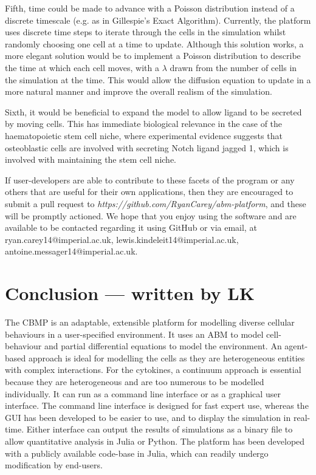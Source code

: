 \documentclass[12pt]{article}
\begin{document}
Fifth, time could be made to advance with a Poisson distribution instead 
of a discrete timescale (e.g. as in Gillespie's Exact Algorithm). 
Currently, the platform uses discrete time steps to iterate through the 
cells in the simulation whilst randomly choosing one cell at a time to 
update. Although this solution works, a more elegant solution would be 
to implement a Poisson distribution to describe the time at which each 
cell moves, with a \(\lambda\) drawn from the number of cells in the simulation at 
the time. This would allow the diffusion equation to update in a more 
natural manner and improve the overall realism of the simulation.

Sixth, it would be beneficial to expand the model to allow ligand to be 
secreted by moving cells. This has immediate biological relevance in the 
case of the haematopoietic stem cell niche, where experimental evidence 
suggests that osteoblastic cells are involved with secreting Notch 
ligand jagged 1, which is involved with maintaining the stem cell niche.
\cite{roeder06}

If user-developers are able to contribute to these facets of the program 
or any others that are useful for their own applications, then they are 
encouraged to submit a pull request to {\itshape 
https://github.com/RyanCarey/abm-platform}, and these will be
promptly actioned. We hope that you enjoy using the software 
and are available to be contacted regarding it using GitHub or via 
email, at ryan.carey14@imperial.ac.uk, 
lewis.kindeleit14@imperial.ac.uk, 
antoine.messager14@imperial.ac.uk.

\section{Conclusion --- written by LK}
The CBMP is an adaptable, extensible platform for modelling diverse cellular behaviours in a user-specified 
environment. It uses an ABM to model cell-behaviour and partial differential equations to model the environment. 
An agent-based approach is ideal for modelling the cells as they are heterogeneous entities with complex 
interactions. For the cytokines, a continuum approach is essential because they are heterogeneous and 
are too numerous to be modelled individually. It can run as a command line interface or as a graphical 
user interface. The command line interface is designed for fast expert use, whereas the GUI has been 
developed to be easier to use, and to display the simulation in real-time. Either interface can output 
the results of simulations as a binary file to allow quantitative analysis in Julia or Python. The platform 
has been developed with a publicly available code-base in Julia, which can readily undergo modification 
by end-users.
\end{document}
